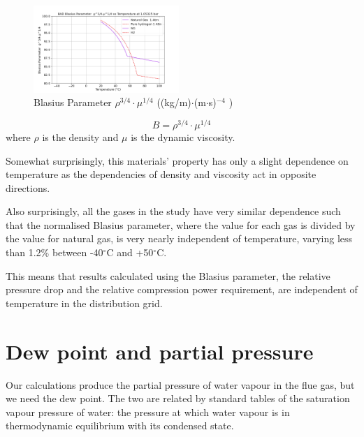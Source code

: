\documentclass[5p]{elsarticle} %
\begin{document}
\begin{figure}[htb]
\centering
\includegraphics[width=0.49\textwidth]{peng_bf.png}
\caption{Blasius Parameter  $\rho^{3/4} \cdot \mu^{1/4}$ ((kg/m)$\cdot$(m$\cdot$s)$^{-4}$ )}
\label{fig:blasiusparam0}
\end{figure}

\begin{equation}
\label{eqn:defnb}
B =  \rho^{3/4} \cdot \mu^{1/4} 
\end{equation}
where $\rho$ is the density and $\mu$ is the dynamic viscosity.

Somewhat surprisingly, this materials' property has only a slight dependence on  temperature as the dependencies of density and viscosity act in opposite directions. 


Also surprisingly, all the gases in the study have very similar dependence such that the normalised Blasius parameter, where the value for each gas is divided by the value for natural gas, is very nearly independent of temperature, varying less than 1.2\% between -40$^\circ$C and +50$^\circ$C.


This means that results calculated using the Blasius parameter, the relative pressure drop  and the relative compression power requirement, are independent of temperature in the distribution grid.

\section{Dew point and partial pressure}
\label{sec:partial pressure}
Our calculations produce the partial pressure of water vapour in the flue gas, but we need the dew point. The two are related by standard tables of the  saturation vapour pressure of water\citep{Perry2008}: the pressure at which water vapour is in thermodynamic equilibrium with its condensed state.
\end{document}
